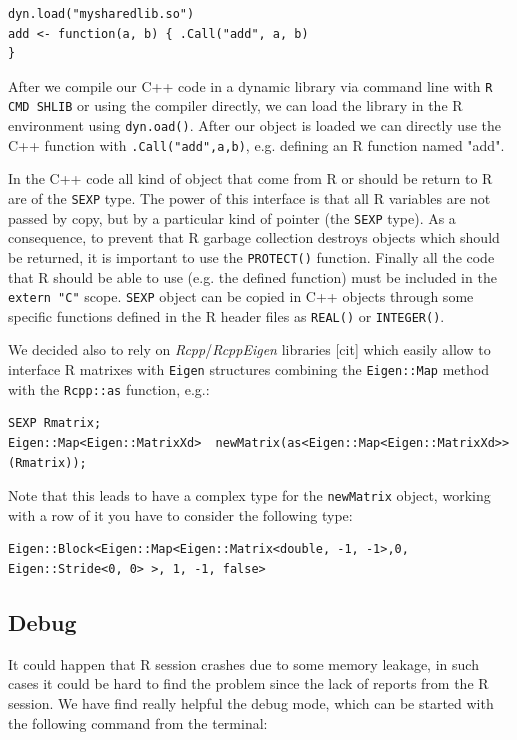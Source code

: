\begin{lstlisting}
dyn.load("mysharedlib.so")
add <- function(a, b) { .Call("add", a, b)
}
\end{lstlisting}

After we compile our C++ code in a dynamic library via command line with \verb|R CMD SHLIB| or using the compiler directly, we can load the library in the R environment using \verb|dyn.oad()|. After our object is loaded we can directly use the C++ function with \verb|.Call("add",a,b)|, e.g. defining an R function named "add".

In the C++ code all kind of object that come from R or should be return to R are of the \verb|SEXP| type. The power of this interface is that all R variables are not passed by copy, but by a particular kind of pointer (the \verb|SEXP| type). As a consequence, to prevent that R garbage collection destroys objects which should be returned, it is important to use the \verb|PROTECT()| function. Finally all the code that R should be able to use (e.g. the defined function) must be included in the \verb|extern "C"| scope. \verb|SEXP| object can be copied in C++ objects through some specific functions defined in the R header files as \verb|REAL()| or \verb|INTEGER()|. 
 
\medskip

We decided also to rely on \emph{Rcpp}/\emph{RcppEigen} libraries [cit] which easily allow to interface R matrixes with \verb|Eigen| structures combining the \verb|Eigen::Map| method with the \verb|Rcpp::as| function, e.g.:

\begin{lstlisting}
SEXP Rmatrix;
Eigen::Map<Eigen::MatrixXd>  newMatrix(as<Eigen::Map<Eigen::MatrixXd>> (Rmatrix));
\end{lstlisting}

Note that this leads to have a complex type for the \verb|newMatrix| object, working with a row of it you have to consider the following type:

\begin{lstlisting}
Eigen::Block<Eigen::Map<Eigen::Matrix<double, -1, -1>,0, Eigen::Stride<0, 0> >, 1, -1, false>
\end{lstlisting}

\subsection{Debug}
It could happen that R session crashes due to some memory leakage, in such cases it could be hard to find the problem since the lack of reports from the R session. We have find really helpful the debug mode, which can be started with the following command from the terminal:

